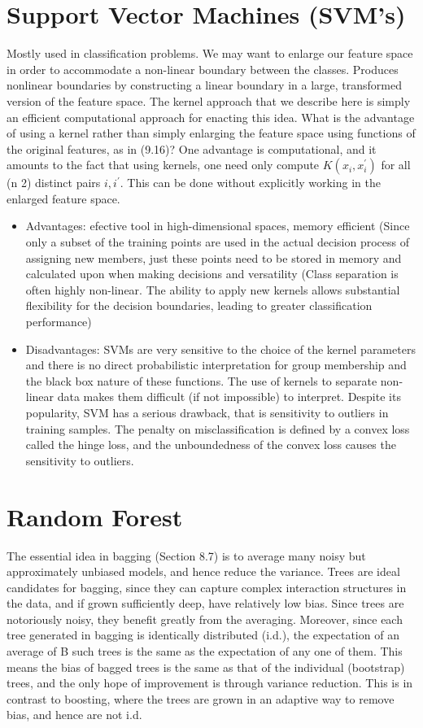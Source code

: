 \section{Support Vector Machines (SVM's)}
Mostly used in classification problems. We may want to enlarge our feature space in order to accommodate a non-linear boundary between the classes. Produces nonlinear boundaries by constructing a linear boundary in
a large, transformed version of the feature space. The kernel approach that we describe here is simply an efficient computational approach for enacting this idea. What is the advantage of using a kernel rather than simply enlarging the feature space using functions of the original features, as in (9.16)? One advantage is computational, and it amounts to the fact that using kernels, one need only compute $K(x_i, x_i^{'})$ for all (n 2) distinct pairs $i, i^{'}$. This can be done without explicitly working in the enlarged feature space.
\begin{itemize}
    \item Advantages: efective tool in high-dimensional spaces, memory efficient (Since only a subset of the training points are used in the
    actual decision process of assigning new members, just these points need
    to be stored in memory and calculated upon when making decisions and versatility (Class separation is often highly non-linear. The ability to apply new kernels allows substantial flexibility for the decision boundaries, leading to greater classification performance)
    \item Disadvantages: SVMs are very sensitive to the choice of the kernel parameters and there is no direct probabilistic interpretation for group membership and the black box nature of these functions. The use of kernels to separate non-linear data makes them difficult (if not impossible) to interpret. Despite its popularity, SVM has a serious drawback, that is sensitivity to outliers in training samples. The penalty on misclassification is defined by a convex loss called the hinge loss, and the unboundedness of the convex loss causes the sensitivity to outliers.
\end{itemize}

\section{Random Forest}

The essential idea in bagging (Section 8.7) is to average many noisy but
approximately unbiased models, and hence reduce the variance. Trees are
ideal candidates for bagging, since they can capture complex interaction
structures in the data, and if grown sufficiently deep, have relatively low
bias. Since trees are notoriously noisy, they benefit greatly from the averaging. Moreover, since each tree generated in bagging is identically distributed (i.d.), the expectation of an average of B such trees is the same as the expectation of any one of them. This means the bias of bagged trees is the same as that of the individual (bootstrap) trees, and the only hope of improvement is through variance reduction. This is in contrast to boosting, where the trees are grown in an adaptive way to remove bias, and hence are not i.d.

